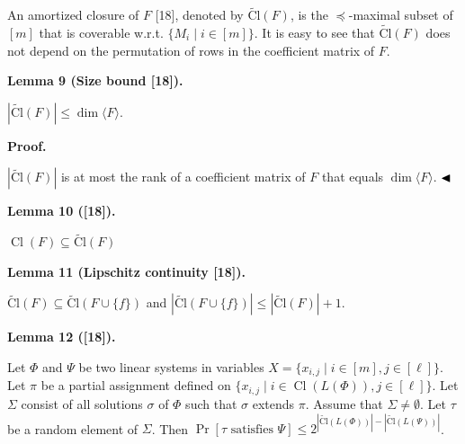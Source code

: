 An amortized closure of $F$ [18], denoted by $\operatorname{\widetilde{Cl}}(F)$, is the $\preceq$-maximal
subset of $[m]$ that is coverable w.r.t. $\{M_{i}\mid i\in[m]\}$.
It is easy to see that $\operatorname{\widetilde{Cl}}(F)$ does not depend on the permutation of rows in the coefficient
matrix of $F$.\par



\par\medskip\noindent\textbf{
Lemma 9 (Size bound [18]).
}\par



$|\operatorname{\widetilde{Cl}}(F)|\leq\dim\langle F\rangle$.\par



\par\medskip\noindent\textbf{Proof.}\par


$|\operatorname{\widetilde{Cl}}(F)|$ is at most the rank of a coefficient matrix of $F$ that equals $\dim\langle F\rangle$.
$\hfill\blacktriangleleft$\par



\par\medskip\noindent\textbf{
Lemma 10 ([18]).
}\par



$\operatorname{Cl}(F)\subseteq\operatorname{\widetilde{Cl}}(F)$\par




\par\medskip\noindent\textbf{
Lemma 11 (Lipschitz continuity [18]).
}\par



$\operatorname{\widetilde{Cl}}(F)\subseteq\operatorname{\widetilde{Cl}}(F\cup\{f\})$ and $|\operatorname{\widetilde{Cl}}(F\cup\{f\})|\leq|\operatorname{\widetilde{Cl}}(F)|+1$.\par




\par\medskip\noindent\textbf{
Lemma 12 ([18]).
}\par



Let $\Phi$ and $\Psi$ be two linear systems in variables $X=\{x_{i,j}\mid i\in[m],j\in[\ell]\}$.
Let $\pi$ be a partial assignment defined on $\{x_{i,j}\mid i\in\operatorname{Cl}(L(\Phi)),j\in[\ell]\}$.
Let $\Sigma$ consist of all solutions $\sigma$ of $\Phi$ such that $\sigma$ extends $\pi$.
Assume that $\Sigma\neq\emptyset$.
Let $\tau$ be a random element of $\Sigma$.
Then $\Pr[\tau\mbox{ satisfies }\Psi]\leq 2^{|\operatorname{\widetilde{Cl}}(L(\Phi))|-|\operatorname{\widetilde{Cl}}(L(\Psi))|}$.\par




